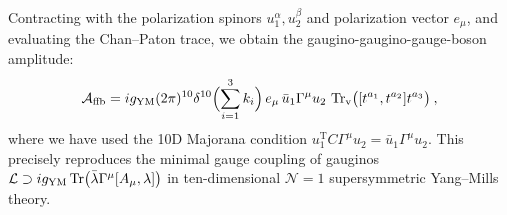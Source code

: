 Contracting with the polarization spinors $u_{1}^{\alpha}, u_{2}^{\beta}$ and polarization vector $e_{\mu}$, and evaluating the Chan--Paton trace, we obtain the gaugino-gaugino-gauge-boson amplitude:
\begin{equation}
	\mathcal{A}_{\mathrm{ffb}} = i g_{\mathrm{YM}}(2\pi)^{10}\delta^{10}\Bigl(\sum_{i=1}^3 k_{i}\Bigr)\,e_{\mu}\,\bar{u}_{1}\Gamma^{\mu}u_{2}\,\operatorname{Tr}_{\mathrm{v}}\bigl([t^{a_{1}},t^{a_{2}}]t^{a_{3}}\bigr) \:, \label{12.4.8}
\end{equation}
where we have used the 10D Majorana condition $u_{1}^{\mathrm{T}}C\Gamma^{\mu}u_{2} = \bar{u}_{1}\Gamma^{\mu}u_{2}$. This precisely reproduces the minimal gauge coupling of gauginos $\mathcal{L} \supset i g_{\mathrm{YM}}\operatorname{Tr}\bigl(\bar{\lambda}\Gamma^{\mu}[A_{\mu}, \lambda]\bigr)$ in ten-dimensional $\mathcal{N}=1$ supersymmetric Yang--Mills theory.

